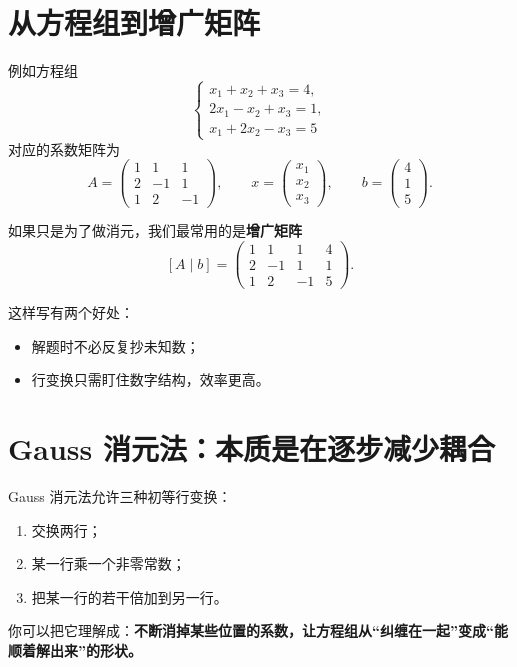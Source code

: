 \documentclass[11pt,oneside,UTF8]{ctexbook}
\newcommand{\important}[1]{\textcolor{Sakura}{\textbf{#1}}}
\begin{document}
\section{从方程组到增广矩阵}

例如方程组
\[
\begin{cases}
x_1+x_2+x_3=4,\\
2x_1-x_2+x_3=1,\\
x_1+2x_2-x_3=5
\end{cases}
\]
对应的系数矩阵为
\[
A=
\begin{pmatrix}
1&1&1\\
2&-1&1\\
1&2&-1
\end{pmatrix},
\qquad
x=
\begin{pmatrix}
x_1\\x_2\\x_3
\end{pmatrix},
\qquad
b=
\begin{pmatrix}
4\\1\\5
\end{pmatrix}.
\]

如果只是为了做消元，我们最常用的是\important{增广矩阵}
\[
[A\mid b]=
\left(
\begin{array}{ccc|c}
1&1&1&4\\
2&-1&1&1\\
1&2&-1&5
\end{array}
\right).
\]

这样写有两个好处：
\begin{itemize}
  \item 解题时不必反复抄未知数；
  \item 行变换只需盯住数字结构，效率更高。
\end{itemize}

\section{Gauss 消元法：本质是在逐步减少耦合}

Gauss 消元法允许三种初等行变换：
\begin{enumerate}
  \item 交换两行；
  \item 某一行乘一个非零常数；
  \item 把某一行的若干倍加到另一行。
\end{enumerate}

你可以把它理解成：\important{不断消掉某些位置的系数，让方程组从“纠缠在一起”变成“能顺着解出来”的形状。}
\end{document}
